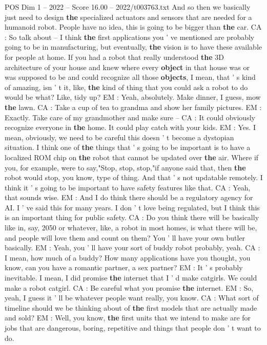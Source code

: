 \begin{textsample}{POS Dim 1 – 2022 – Score 16.00 – 2022/t003763.txt}
And so then we basically just need to design \textbf{the} specialized actuators and sensors that are needed for a humanoid robot.
People have no idea, this is going to be bigger than \textbf{the} car.
CA : So talk about -- I think \textbf{the} first applications you ' ve mentioned are probably going to be in manufacturing, but eventually, \textbf{the} vision is to have these available for people at home.
If you had a robot that really understood \textbf{the} 3D architecture of your house and knew where every \textbf{object} in that house was or was supposed to be and could recognize all those \textbf{objects}, I mean, that ' s kind of amazing, isn ' t it, like, \textbf{the} kind of thing that you could ask a robot to do would be what?
Like, tidy up?
EM : Yeah, absolutely.
Make dinner, I guess, mow \textbf{the} lawn.
CA : Take a cup of tea to grandma and show her family pictures.
EM : Exactly.
Take care of my grandmother and make sure -- CA : It could obviously recognize everyone in \textbf{the} home.
It could play catch with your kids.
EM : Yes.
I mean, obviously, we need to be careful this doesn ' t become a dystopian situation.
I think one of \textbf{the} things that ' s going to be important is to have a localized ROM chip on \textbf{the} robot that cannot be updated over \textbf{the} air.
Where if you, for example, were to say,"Stop, stop, stop,"if anyone said that, then \textbf{the} robot would stop, you know, type of thing.
And that ' s not updatable remotely.
I think it ' s going to be important to have safety features like that.
CA : Yeah, that sounds wise.
EM : And I do think there should be a regulatory agency for AI.
I ' ve said this for many years.
I don ' t love being regulated, but I think this is an important thing for public safety.
CA : Do you think there will be basically like in, say, 2050 or whatever, like, a robot in most homes, is what there will be, and people will love them and count on them?
You ' ll have your own butler basically.
EM : Yeah, you ' ll have your sort of buddy robot probably, yeah.
CA : I mean, how much of a buddy?
How many applications have you thought, you know, can you have a romantic partner, a sex partner?
EM : It ' s probably inevitable.
I mean, I did promise \textbf{the} internet that I ' d make catgirls.
We could make a robot catgirl.
CA : Be careful what you promise \textbf{the} internet.
EM : So, yeah, I guess it ' ll be whatever people want really, you know.
CA : What sort of timeline should we be thinking about of \textbf{the} first models that are actually made and sold?
EM : Well, you know, \textbf{the} first units that we intend to make are for jobs that are dangerous, boring, repetitive and things that people don ' t want to do.

\end{textsample}
